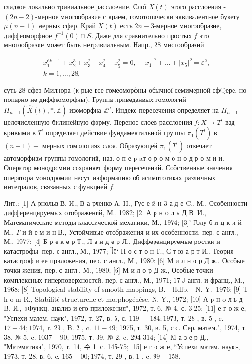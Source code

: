 \documentclass[10pt]{article}
\begin{document}
гладкое локально тривиальное расслоение. Слої $X(t)$ этого расслоения - $(2 n-2)$-мерное многообразие с краем, гомотопически эквивалентное букету $\mu(n-1)$ мерных сфер. Край $X(t)$ есть $2 n-3$-мерное многообразие, диффеоморфное $f^{-1}(0) \cap S$. Даже для сравнительно простых $f$ это многообразие может быть нетривиальным. Напр., 28 многообразий



\[

\begin{gathered}

x_{1}^{6 k-1}+x_{2}^{3}+x_{3}^{2}+x_{4}^{2}+x_{5}^{2}=0, \quad\left|x_{1}\right|^{2}+\ldots+\left|x_{5}\right|^{2}=\varepsilon^{2}, \\

k=1, \ldots, 28,

\end{gathered}

\]



суть 28 сфер Милнора (к-рые все гомеоморфны обычної семимерной сф্ере, но попарно не диффеоморфны). Группа приведенвых гомологий $H_{n-1}(\hat{X}(t), *, \mathbb{Z})$ изоморфна $\mathbb{Z}^{\mu}$. Индекс пересечения определяет на $H_{n-1}$ целочисленную билинейную форму. Перенос слоев расслоения $f: X \rightarrow T^{\prime}$ вад кривыми в $T^{\prime}$ определяет действие фундаментальной группы $\pi_{1}\left(T^{\prime}\right)$ в $(n-1)-$ мерных гомологиях слоя. Образующей $\pi_{1}\left(T^{\prime}\right)$ отвечает автоморфизм группы гомологий, наз. о п е p aт о р о м о н о д р о м и и. Оператор монодромии сохраняет форму пересечений. Собственные значения оператора монодромии несут информапию об асимптотиках различных интегралов, связанных с функцией $f$.



Лит.: [1] А рнольв В. И., В а рченко А. Н., Гус е й н-3 а д е C.. М., Особенности дифференцируемых отображений, М., 1982; [2] А р н о л ь Д В. И., Математические методы классической механики, М., 1974; [3]' Голу б и ц к и й М., $\Gamma$ и й е м и н В., Устойчивые отображения и их особенности, пер. с англ., М., 1977; [4] Б р е к е р Т., Л а н д е р Л., Дифференцируемые ростки и катастрофы, пер. с англ., М., 1977; โ5` П о с т о н Т., С т ю а р т И., Теория катастроф и ее приложения, пер. с англ., М., 1980; [6] М и л н о р Д ж., Особые точки жения, пер. с англ., М., 1980; [6] М и л о р Д ж., Особые точки комплексных гиперповерхностей, пер. с англ., М., 1971; $17 \mathrm{~J}$ англ. и франц., M., 1968; [8] Topological stability of smooth mappings, B. - Hdlb. - N. Y., 1976; [9] T h o m R., Stabilité structurelle et morphogénèse, N. Y., 1972; [10] А p н o л ь д B. И., «Функц. анализ и его приложения", 1972, т. 6, № 4, с. 3-25; [11] е г о ж е, "Успехи матем. наук", 1972, т. 27, в. 5, с. $119-$ $184 ; 1973$, т. 28 , в. 5 , c. $17-44 ; 1974$, т. 29 , B. 2 , c. $11-49$; 1975, т. 30, в. 5, с с. Сер. матем.", 1974, т. 38, № 5, c. $1037-90$; 1975, т. 39, № 2, c. 294-314; [14] M а з е р Д., "Математика", 1970, т. 14, 수 1, с. 145-75; [15] е г о ж е, “Успехи матем. наук», 1973, т. 28, в. 6, c. $165-00 ; 1974$, т. 29 , в. 1 , c. $99-158$.
\end{document}
